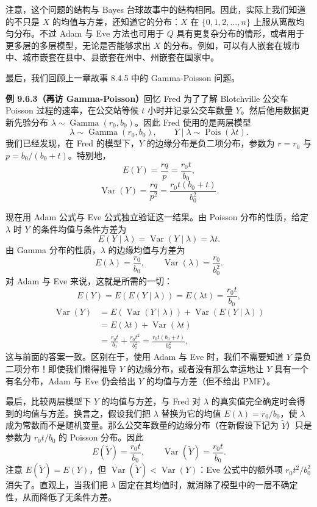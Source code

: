 \documentclass[UTF8,12pt,a4paper,fontset=fandol]{ctexart}
\begin{document}
注意，这个问题的结构与 Bayes 台球故事中的结构相同。因此，实际上我们知道的不只是 $X$ 的均值与方差，还知道它的分布：$X$ 在 $\{0,1,2,\ldots,n\}$ 上服从离散均匀分布。不过 Adam 与 Eve 方法也可用于 $Q$ 具有更复杂分布的情形，或者用于更多层的多层模型，无论是否能够求出 $X$ 的分布。例如，可以有人嵌套在城市中、城市嵌套在县中、县嵌套在州中、州嵌套在国家中。

最后，我们回顾上一章故事 8.4.5 中的 Gamma-Poisson 问题。

\noindent\textbf{例 9.6.3（再访 Gamma-Poisson）}\quad 回忆 Fred 为了了解 Blotchville 公交车 Poisson 过程的速率，在公交站等候 $t$ 小时并记录公交车数量 $Y$。然后他用数据更新先验分布 $\lambda\sim\operatorname{Gamma}(r_0,b_0)$。因此 Fred 使用的是两层模型
\[
  \lambda\sim\operatorname{Gamma}(r_0,b_0),\qquad
  Y\mid \lambda\sim\operatorname{Pois}(\lambda t).
\]
我们已经发现，在 Fred 的模型下，$Y$ 的边缘分布是负二项分布，参数为 $r=r_0$ 与 $p=b_0/(b_0+t)$。特别地，
\[
  E(Y)=\frac{rq}{p}=\frac{r_0t}{b_0},
\]
\[
  \operatorname{Var}(Y)=\frac{rq}{p^2}
  =\frac{r_0t(b_0+t)}{b_0^2}.
\]

现在用 Adam 公式与 Eve 公式独立验证这一结果。由 Poisson 分布的性质，给定 $\lambda$ 时 $Y$ 的条件均值与条件方差为
\[
  E(Y\mid \lambda)=\operatorname{Var}(Y\mid \lambda)=\lambda t.
\]
由 Gamma 分布的性质，$\lambda$ 的边缘均值与方差为
\[
  E(\lambda)=\frac{r_0}{b_0},\qquad \operatorname{Var}(\lambda)=\frac{r_0}{b_0^2}.
\]
对 Adam 与 Eve 来说，这就是所需的一切：
\[
  E(Y)=E(E(Y\mid \lambda))=E(\lambda t)=\frac{r_0t}{b_0},
\]
\[
\begin{aligned}
  \operatorname{Var}(Y)
  &=E(\operatorname{Var}(Y\mid \lambda))+\operatorname{Var}(E(Y\mid \lambda))\\
  &=E(\lambda t)+\operatorname{Var}(\lambda t)\\
  &=\frac{r_0t}{b_0}+\frac{r_0t^2}{b_0^2}
  =\frac{r_0t(b_0+t)}{b_0^2},
\end{aligned}
\]
这与前面的答案一致。区别在于，使用 Adam 与 Eve 时，我们不需要知道 $Y$ 是负二项分布！即使我们懒得推导 $Y$ 的边缘分布，或者没有那么幸运地让 $Y$ 具有一个有名分布，Adam 与 Eve 仍会给出 $Y$ 的均值与方差（但不给出 PMF）。

最后，比较两层模型下 $Y$ 的均值与方差，与 Fred 对 $\lambda$ 的真实值完全确定时会得到的均值与方差。换言之，假设我们把 $\lambda$ 替换为它的均值 $E(\lambda)=r_0/b_0$，使 $\lambda$ 成为常数而不是随机变量。那么公交车数量的边缘分布（在新假设下记为 $\tilde Y$）只是参数为 $r_0t/b_0$ 的 Poisson 分布。因此
\[
  E(\tilde Y)=\frac{r_0t}{b_0},\qquad
  \operatorname{Var}(\tilde Y)=\frac{r_0t}{b_0}.
\]
注意 $E(\tilde Y)=E(Y)$，但 $\operatorname{Var}(\tilde Y)<\operatorname{Var}(Y)$：Eve 公式中的额外项 $r_0t^2/b_0^2$ 消失了。直观上，当我们把 $\lambda$ 固定在其均值时，就消除了模型中的一层不确定性，从而降低了无条件方差。
\end{document}
